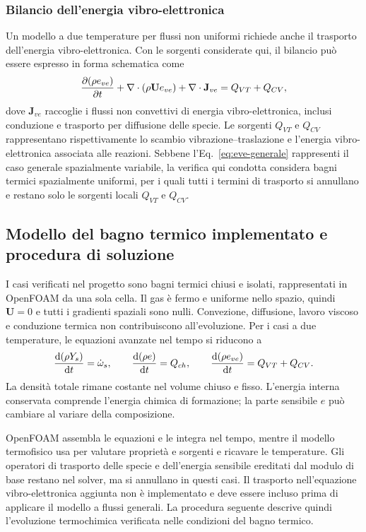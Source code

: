 \subsubsection{Bilancio dell'energia vibro-elettronica}

Un modello a due temperature per flussi non uniformi richiede anche il
trasporto dell'energia vibro-elettronica. Con le sorgenti considerate qui,
il bilancio può essere espresso in forma schematica come
\begin{equation}
  \frac{\partial (\rho e_{ve})}{\partial t}
  + \nabla\cdot(\rho\mathbf{U}e_{ve})
  + \nabla\cdot\mathbf{J}_{ve} = Q_{VT} + Q_{CV} ,
  \label{eq:eve-generale}
\end{equation}
dove $\mathbf{J}_{ve}$ raccoglie i flussi non convettivi di energia
vibro-elettronica, inclusi conduzione e trasporto per diffusione delle specie.
Le sorgenti $Q_{VT}$ e $Q_{CV}$ rappresentano rispettivamente lo scambio
vibrazione--traslazione e l'energia vibro-elettronica associata alle reazioni.
Sebbene l'Eq.~\eqref{eq:eve-generale} rappresenti il caso generale
spazialmente variabile, la verifica qui condotta considera bagni termici
spazialmente uniformi, per i quali tutti i termini di trasporto si annullano
e restano solo le sorgenti locali $Q_{VT}$ e $Q_{CV}$.

\subsection{Modello del bagno termico implementato e procedura di soluzione}
\label{sec:implementato}

I casi verificati nel progetto sono bagni termici chiusi e isolati,
rappresentati in OpenFOAM da una sola cella. Il gas è fermo e uniforme nello
spazio, quindi $\mathbf{U}=0$ e tutti i gradienti spaziali sono nulli.
Convezione, diffusione, lavoro viscoso e conduzione termica non contribuiscono
all'evoluzione. Per i casi a due temperature, le equazioni avanzate nel tempo
si riducono a
\begin{equation}
  \frac{\mathrm{d}(\rho Y_s)}{\mathrm{d}t} = \dot\omega_s ,
  \qquad
  \frac{\mathrm{d}(\rho e)}{\mathrm{d}t} = Q_{ch} ,
  \qquad
  \frac{\mathrm{d}(\rho e_{ve})}{\mathrm{d}t} = Q_{VT}+Q_{CV} .
\end{equation}
La densità totale rimane costante nel volume chiuso e fisso. L'energia interna
conservata comprende l'energia chimica di formazione; la parte sensibile $e$
può cambiare al variare della composizione.

OpenFOAM assembla le equazioni e le integra nel tempo, mentre il modello
termofisico usa \mpp{} per valutare proprietà e sorgenti e ricavare le
temperature. Gli operatori di trasporto delle specie e dell'energia sensibile
ereditati dal modulo di base restano nel solver, ma si annullano in questi
casi. Il trasporto nell'equazione vibro-elettronica aggiunta non è implementato
e deve essere incluso prima di applicare il modello a flussi generali. La
procedura seguente descrive quindi l'evoluzione termochimica verificata nelle
condizioni del bagno termico.

